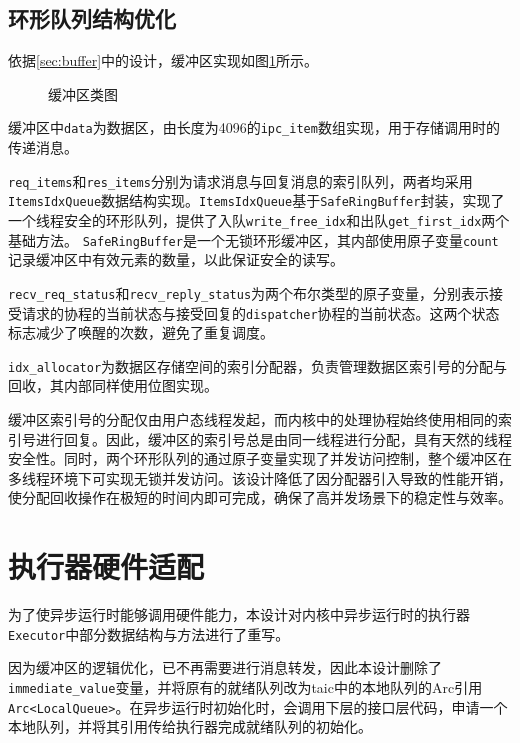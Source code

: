 \subsection{环形队列结构优化}

依据\ref{sec:buffer}中的设计，缓冲区实现如图\ref{缓冲区类图}所示。

\begin{figure}[htbp]
  \centering
  
  \caption{缓冲区类图}\label{缓冲区类图}
\end{figure}

缓冲区中\texttt{data}为数据区，由长度为4096的\texttt{ipc\_item}数组实现，用于存储调用时的传递消息。

\texttt{req\_items}和\texttt{res\_items}分别为请求消息与回复消息的索引队列，两者均采用\texttt{ItemsIdxQueue}数据结构实现。\texttt{ItemsIdxQueue}基于\texttt{SafeRingBuffer}封装，实现了一个线程安全的环形队列，提供了入队\texttt{write\_free\_idx}和出队\texttt{get\_first\_idx}两个基础方法。
\texttt{SafeRingBuffer}是一个无锁环形缓冲区，其内部使用原子变量\texttt{count}记录缓冲区中有效元素的数量，以此保证安全的读写。

\texttt{recv\_req\_status}和\texttt{recv\_reply\_status}为两个布尔类型的原子变量，分别表示接受请求的协程的当前状态与接受回复的\texttt{dispatcher}协程的当前状态。这两个状态标志减少了唤醒的次数，避免了重复调度。

\texttt{idx\_allocator}为数据区存储空间的索引分配器，负责管理数据区索引号的分配与回收，其内部同样使用位图实现。

缓冲区索引号的分配仅由用户态线程发起，而内核中的处理协程始终使用相同的索引号进行回复。因此，缓冲区的索引号总是由同一线程进行分配，具有天然的线程安全性。同时，两个环形队列的通过原子变量实现了并发访问控制，整个缓冲区在多线程环境下可实现无锁并发访问。该设计降低了因分配器引入导致的性能开销，使分配回收操作在极短的时间内即可完成，确保了高并发场景下的稳定性与效率。

\section{执行器硬件适配}

为了使异步运行时能够调用硬件能力，本设计对内核中异步运行时的执行器\texttt{Executor}中部分数据结构与方法进行了重写。

因为缓冲区的逻辑优化，已不再需要进行消息转发，因此本设计删除了\texttt{immediate\_value}变量，并将原有的就绪队列改为taic中的本地队列的Arc引用\texttt{Arc<LocalQueue>}。在异步运行时初始化时，会调用下层的接口层代码，申请一个本地队列，并将其引用传给执行器完成就绪队列的初始化。

